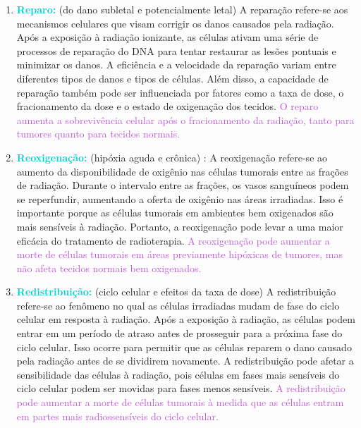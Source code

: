 \documentclass[11pt,a4paper]{article}
\begin{document}
	\begin{enumerate}
		\item \textcolor{DarkTurquoise}{\textbf{Reparo:}} (do dano subletal e potencialmente letal) A reparação refere-se aos mecanismos celulares que visam corrigir os danos causados pela radiação. Após a exposição à radiação ionizante, as células ativam uma série de processos de reparação do DNA para tentar restaurar as lesões pontuais e minimizar os danos. A eficiência e a velocidade da reparação variam entre diferentes tipos de danos e tipos de células. Além disso, a capacidade de reparação também pode ser influenciada por fatores como a taxa de dose, o fracionamento da dose e o estado de oxigenação dos tecidos. \textcolor{MediumOrchid}{O reparo aumenta a sobrevivência celular após o fracionamento da radiação, tanto para tumores quanto para tecidos normais.}
		
		\item \textcolor{DarkTurquoise}{\textbf{Reoxigenação:}} (hipóxia aguda e crônica) : A reoxigenação refere-se ao aumento da disponibilidade de oxigênio nas células tumorais entre as frações de radiação. Durante o intervalo entre as frações, os vasos sanguíneos podem se reperfundir, aumentando a oferta de oxigênio nas áreas irradiadas. Isso é importante porque as células tumorais em ambientes bem oxigenados são mais sensíveis à radiação. Portanto, a reoxigenação pode levar a uma maior eficácia do tratamento de radioterapia. \textcolor{MediumOrchid}{A reoxigenação pode aumentar a morte de células tumorais em áreas previamente hipóxicas de tumores, mas não afeta tecidos normais bem oxigenados.}
				
		\item \textcolor{DarkTurquoise}{\textbf{Redistribuição:}} (ciclo celular e efeitos da taxa de dose)   A redistribuição refere-se ao fenômeno no qual as células irradiadas mudam de fase do ciclo celular em resposta à radiação. Após a exposição à radiação, as células podem entrar em um período de atraso antes de prosseguir para a próxima fase do ciclo celular. Isso ocorre para permitir que as células reparem o dano causado pela radiação antes de se dividirem novamente. A redistribuição pode afetar a sensibilidade das células à radiação, pois células em fases mais sensíveis do ciclo celular podem ser movidas para fases menos sensíveis. \textcolor{MediumOrchid}{A redistribuição pode aumentar a morte de células tumorais à medida que as células entram em partes mais radiossensíveis do ciclo celular.}
		

\end{enumerate}
\end{document}
